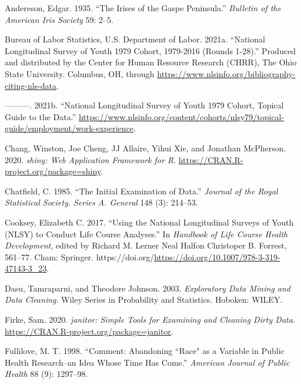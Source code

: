\documentclass{article}
\newlength{\cslhangindent}
\newlength{\cslentryspacingunit} %
\newenvironment{CSLReferences}[2] %
 {%
  \setlength{\parindent}{0pt}
  \ifodd #1
  \let\oldpar\par
  \def\par{\hangindent=\cslhangindent\oldpar}
  \fi
  \setlength{\parskip}{#2\cslentryspacingunit}
 }%
 {}
\begin{document}
\hypertarget{refs}{}
\begin{CSLReferences}{1}{0}
\leavevmode{}%
Andereson, Edgar. 1935. {``The Irises of the Gaspe Peninsula.''} \emph{Bulletin of the American Iris Society} 59: 2--5.

\leavevmode{}%
Bureau of Labor Statistics, U.S. Department of Labor. 2021a. {``National Longitudinal Survey of Youth 1979 Cohort, 1979-2016 (Rounds 1-28).''} Produced and distributed by the Center for Human Resource Research (CHRR), The Ohio State University. Columbus, OH, through \url{https://www.nlsinfo.org/bibliography-citing-nls-data}.

\leavevmode{}%
---------. 2021b. {``National Longitudinal Survey of Youth 1979 Cohort, Topical Guide to the Data.''} \url{https://www.nlsinfo.org/content/cohorts/nlsy79/topical-guide/employment/work-experience}.

\leavevmode{}%
Chang, Winston, Joe Cheng, JJ Allaire, Yihui Xie, and Jonathan McPherson. 2020. \emph{{shiny: Web Application Framework for R}}. \url{https://CRAN.R-project.org/package=shiny}.

\leavevmode{}%
Chatfield, C. 1985. {``The Initial Examination of Data.''} \emph{Journal of the Royal Statistical Society. Series A. General} 148 (3): 214--53.

\leavevmode{}%
Cooksey, Elizabeth C. 2017. {``Using the National Longitudinal Surveys of Youth (NLSY) to Conduct Life Course Analyses.''} In \emph{Handbook of Life Course Health Development}, edited by Richard M. Lerner Neal Halfon Christoper B. Forrest, 561--77. Cham: Springer. https://doi.org/\url{https://doi.org/10.1007/978-3-319-47143-3_23}.

\leavevmode{}%
Dasu, Tamraparni, and Theodore Johnson. 2003. \emph{Exploratory Data Mining and Data Cleaning}. Wiley Series in Probability and Statistics. Hoboken: WILEY.

\leavevmode{}%
Firke, Sam. 2020. \emph{{janitor: Simple Tools for Examining and Cleaning Dirty Data}}. \url{https://CRAN.R-project.org/package=janitor}.

\leavevmode{}%
Fullilove, M. T. 1998. {``Comment: Abandoning ``Race" as a Variable in Public Health Research--an Idea Whose Time Has Come.''} \emph{American Journal of Public Health} 88 (9): 1297--98.


\end{CSLReferences}
\end{document}
